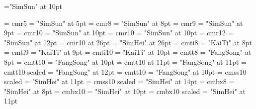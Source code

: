 %
\ifadobefont
  \def\song{Adobe Song Std}
  \def\hei{Adobe Heiti Std}
  \def\kai{Adobe Kaiti Std}
  \def\fang{Adobe Fangsong Std}
\else
  \def\song{SimSun}
  \def\hei{SimHei}
  \def\kai{KaiTi}
  \def\fang{FangSong}
\fi
%
\font\zhfont="\song" at 10pt
\def\zhpunctfont{\zhfont}

\zhspacing
\font\enfiverm = cmr5
\font\zhfiverm = "\song" at 5pt
\def\fiverm{\enfiverm\let\zhfont\zhfiverm}
\font\eneightrm = cmr8
\font\zheightrm = "\song" at 8pt
\def\eightrm{\eneightrm\let\zhfont\zheightrm}
\font\enninerm = cmr9 %
\font\zhninerm = "\song" at 9pt
\def\ninerm{\enninerm\let\zhfont\zhninerm}
\font\entenrm = cmr10 %
\font\zhtenrm = "\song"  at 10pt
\def\tenrm{\entenrm\let\zhfont\zhtenrm}
\font\enoldtenrm = cmr10 %
\font\zholdtenrm = "\song"  at 10pt
\def\oldtenrm{\enoldtenrm\let\zhfont\zholdtenrm}
\font\entwelverm = cmr12
\font\zhtwelverm = "\song"  at 12pt
\def\twelverm{\entwelverm\let\zhfont\zhtwelverm}
\font\entwentysixrm = cmr10 at 26pt
\font\zhtwentysixrm = "\hei"  at 26pt
\def\twentysixrm{\entwentysixrm\let\zhfont\zhtwentysixrm}
%
\font\eneightit = cmti8
\font\zheightit = "\kai" at 8pt
\def\eightit{\eneightit\let\zhfont\zheightit}
\font\ennineit = cmti9
\font\zheightit = "\kai" at 9pt
\def\nineit{\ennineit\let\zhfont\zhnineit}
\font\entenit = cmti10
\font\zhtenit = "\kai" at 10pt
\def\tenit{\entenit\let\zhfont\zhtenit}
%
\font\eneighttt = cmtt8
\font\zheighttt = "\fang" at 8pt
\def\eighttt{\eneighttt\let\zhfont\zheighttt}
\font\ententt = cmtt10 
\font\zhtentt = "\fang" at 10pt
\def\tentt{\ententt\let\zhfont\zhtentt}
\font\eneleventt = cmtt10 at 11pt
\font\zheleventt = "\fang" at 11pt
\def\elventt{\enelventt\let\zhfont\zhelventt}
\font\entwelvett = cmtt10 scaled 
\font\zhtwelvett = "\fang" at 12pt
\def\twelvett{\entwelvett\let\zhfont\zhtwelvett}
%
\font\entenbt = cmtt10
\font\zhtenbt = "\fang" at 10pt
\def\tenbt{\entenbt\let\zhfont\zhtenbt}
%
\font\enelevensf = cmss10 scaled\magstephalf
\font\zhelevensf = "\hei" at 11pt
\def\elevensf{\enelevensf\let\zhfont\zhelevensf}
\font\enfourteensf = cmss10 scaled
\font\zhfourteensf = "\hei" at 14pt
\def\fourteensf{\enfourteensf\let\zhfont\zhfourteensf}
%
\font\eneightbf = cmbx8
\font\zheightbf = "\hei" at 8pt
\def\eightbf{\eneightbf\let\zhfont\zheightbf}
\font\entenbf = cmbx10
\font\zhtenbf = "\hei" at 10pt
\def\tenbf{\entenbf\let\zhfont\zhtenbf}
\font\enelevenbf = cmbx10 scaled \magstephalf
\font\zhelevenbf = "\hei" at 11pt
\def\elevenbf{\enelevenbf\let\zhfont\zhelevenbf}
